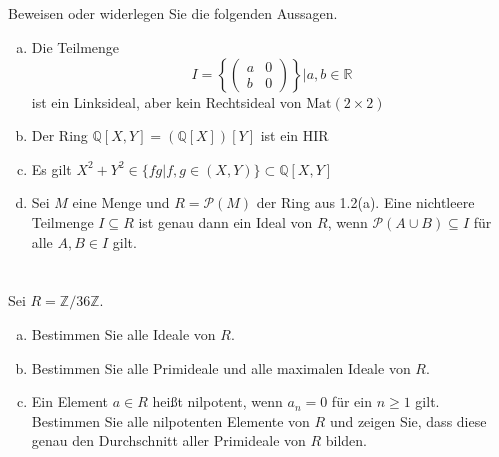\documentclass{article}
\newcommand{\Z}{\mathbb{Z}}
\newcommand{\R}{\mathbb{R}}
\newcommand{\Q}{\mathbb{Q}}
\newcommand{\Mat}{\text{Mat}}
\begin{document}
\subsection{}
\color{blue}
Beweisen oder widerlegen Sie die folgenden Aussagen.
\color{black}
\begin{enumerate}[(a)]
    \item
        \color{blue}
        Die Teilmenge
        \begin{equation*}
            I=\left\{
            \begin{pmatrix}
                a&0\\b&0
            \end{pmatrix}
            \right\}|a,b\in\R
        \end{equation*}
        ist ein Linksideal, aber kein Rechtsideal von $\Mat(2\times 2)$
        \color{black}
    \item
        \color{blue}
        Der Ring $\Q[X,Y]=(\Q[X])[Y]$ ist ein HIR
        \color{black}
    \item
        \color{blue}
        Es gilt $X^2+Y^2\in\{fg|f,g\in(X,Y)\}\subset\Q[X,Y]$
        \color{black}
    \item
        \color{blue}
        Sei $M$ eine Menge und $R=\mathcal P(M)$ der Ring aus 1.2(a). Eine
        nichtleere Teilmenge $I\subseteq R$ ist genau dann ein Ideal von $R$, wenn
        $\mathcal P(A\cup B)\subseteq I$ für alle $A,B\in I$ gilt.
        \color{black}
\end{enumerate}
\section{}
\subsection{}
\color{blue}
Sei $R = \Z/36\Z$.
\color{black}
\begin{enumerate}[(a)]
    \item
        \color{blue}
        Bestimmen Sie alle Ideale von $R$.
        \color{black}
    \item
        \color{blue}
        Bestimmen Sie alle Primideale und alle maximalen Ideale von $R$.
        \color{black}
    \item
        \color{blue}
        Ein Element $a\in R$ heißt nilpotent, wenn $a_n=0$ für ein $n\geq 1$ gilt. Bestimmen Sie
        alle nilpotenten Elemente von $R$ und zeigen Sie, dass diese genau den Durchschnitt
        aller Primideale von $R$ bilden.
        \color{black}
\end{enumerate}
\end{document}
